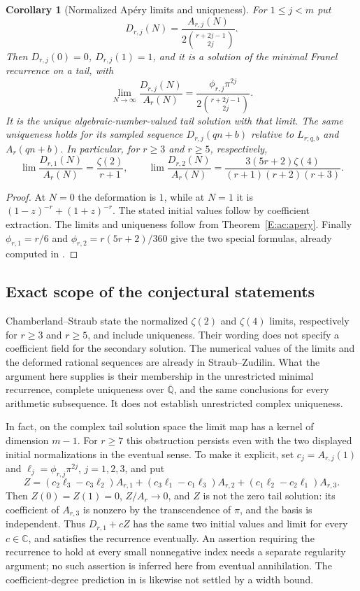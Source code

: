 \documentclass[11pt,a4paper]{article}
\newtheorem{corollary}[theorem]{Corollary}
\theoremstyle{definition}
\theoremstyle{remark}
\numberwithin{equation}{section}
\begin{document}
\begin{corollary}[Normalized Ap\'ery limits and uniqueness]
\label{E:ac:normalized}
For $1\le j<m$ put
\[
 D_{r,j}(N)=\frac{A_{r,j}(N)}{2\binom{r+2j-1}{2j}}.
\]
Then $D_{r,j}(0)=0$, $D_{r,j}(1)=1$, and it is a solution of the
minimal Franel recurrence on a tail, with
\[
 \lim_{N\to\infty}\frac{D_{r,j}(N)}{A_r(N)}
 =\frac{\phi_{r,j}\pi^{2j}}{2\binom{r+2j-1}{2j}}.
\]
It is the unique algebraic-number-valued tail solution with that
limit. The same uniqueness holds for its sampled sequence
$D_{r,j}(qn+b)$ relative to $L_{r;q,b}$ and $A_r(qn+b)$.
In particular, for $r\ge3$ and $r\ge5$, respectively,
\[
 \lim\frac{D_{r,1}(N)}{A_r(N)}=\frac{\zeta(2)}{r+1},
 \qquad
 \lim\frac{D_{r,2}(N)}{A_r(N)}
 =\frac{3(5r+2)\zeta(4)}{(r+1)(r+2)(r+3)}.
\]
\end{corollary}
\begin{proof}
At $N=0$ the deformation is $1$, while at $N=1$ it is
$(1-z)^{-r}+(1+z)^{-r}$. The stated initial values follow by
coefficient extraction. The limits and uniqueness follow from
Theorem~\ref{E:ac:apery}. Finally
$\phi_{r,1}=r/6$ and $\phi_{r,2}=r(5r+2)/360$ give the two
special formulas, already computed in \cite[Examples 1.5 and 1.7]{AC_SZ}.
\end{proof}

\subsection{Exact scope of the conjectural statements}

Chamberland--Straub \cite[Conjectures 9 and 11]{AC_CS} state the
normalized $\zeta(2)$ and $\zeta(4)$ limits, respectively for
$r\ge3$ and $r\ge5$, and include uniqueness. Their wording does not
specify a coefficient field for the secondary solution. The numerical
values of the limits and the deformed rational sequences are already
in Straub--Zudilin. What the argument here supplies is their membership
in the unrestricted minimal recurrence, complete uniqueness over
$\overline{\mathbb Q}$, and the same conclusions for every arithmetic
subsequence. It does not establish unrestricted complex uniqueness.

In fact, on the complex tail solution space the limit map has a
kernel of dimension $m-1$. For $r\ge7$ this obstruction persists
even with the two displayed initial normalizations in the eventual
sense. To make it explicit, set $c_j=A_{r,j}(1)$ and
$\ell_j=\phi_{r,j}\pi^{2j}$, $j=1,2,3$, and put
\[
 Z=(c_2\ell_3-c_3\ell_2)A_{r,1}
   +(c_3\ell_1-c_1\ell_3)A_{r,2}
   +(c_1\ell_2-c_2\ell_1)A_{r,3}.
\]
Then $Z(0)=Z(1)=0$, $Z/A_r\to0$, and $Z$ is not the zero tail
solution: its coefficient of $A_{r,3}$ is nonzero by the transcendence
of $\pi$, and the basis is independent. Thus $D_{r,1}+cZ$ has the
same two initial values and limit for every $c\in\mathbb C$, and
satisfies the recurrence eventually. An assertion requiring the
recurrence to hold at every small nonnegative index needs a separate
regularity argument; no such assertion is inferred here from eventual
annihilation. The coefficient-degree prediction in
\cite[Remark 4.1]{AC_SZ} is likewise not settled by a width bound.
\end{document}
